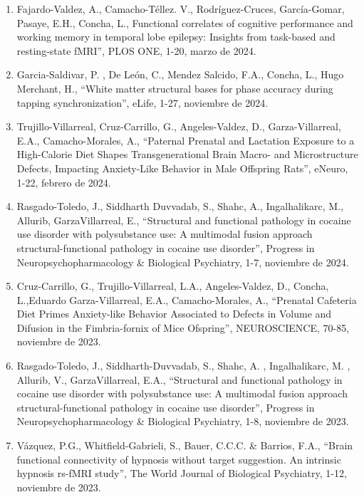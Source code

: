 \begin{enumerate}
\item Fajardo-Valdez, A., Camacho-Téllez. V., Rodríguez-Cruces, García-Gomar, Pasaye, E.H., Concha, L., Functional correlates of cognitive 
performance and working memory in temporal lobe epilepsy: Insights from task-based and resting-state fMRI”, PLOS ONE, 1-20, marzo de 2024.

\item Garcia-Saldivar, P. , De León, C., Mendez Salcido, F.A., Concha, L., Hugo Merchant, H., “White matter structural bases for phase 
accuracy 
during tapping synchronization”, eLife, 1-27, noviembre de 2024.

\item Trujillo-Villarreal, Cruz-Carrillo, G., Angeles-Valdez, D., Garza-Villarreal, E.A., Camacho-Morales, A., “Paternal Prenatal and 
Lactation 
Exposure to a High-Calorie Diet Shapes Transgenerational Brain Macro- and Microstructure Defects, Impacting Anxiety-Like Behavior in Male 
Offspring Rats”, eNeuro, 1-22, febrero de 2024.

\item Rasgado-Toledo, J., Siddharth Duvvadab, S., Shahc, A., Ingalhalikarc, M., Allurib, GarzaVillarreal, E., “Structural and functional 
pathology 
in cocaine use disorder with polysubstance use: A multimodal fusion approach structural-functional pathology in cocaine use disorder”, 
Progress in Neuropsychopharmacology \& Biological Psychiatry, 1-7, noviembre de 2024.

\item Cruz-Carrillo, G., Trujillo-Villarreal, L.A., Angeles-Valdez, D., Concha, L.,Eduardo Garza-Villarreal, E.A., Camacho-Morales, A., 
“Prenatal 
Cafeteria Diet Primes Anxiety-like Behavior Associated to Defects in Volume and Difusion in the Fimbria-fornix of Mice Ofspring”, 
NEUROSCIENCE, 70-85, noviembre de 2023.

\item Rasgado-Toledo, J., Siddharth-Duvvadab, S., Shahc, A. , Ingalhalikarc, M. , Allurib, V., GarzaVillarreal, E.A., “Structural and 
functional 
pathology in cocaine use disorder with polysubstance use: A multimodal fusion approach structural-functional pathology in cocaine use 
disorder”, Progress in Neuropsychopharmacology \& Biological Psychiatry, 1-8, noviembre de 2023.

\item Vázquez, P.G., Whitfield-Gabrieli, S., Bauer, C.C.C. \& Barrios, F.A., “Brain functional connectivity of hypnosis without target 
suggestion. 
An intrinsic hypnosis rs-fMRI study”, The World Journal of Biological Psychiatry, 1-12, noviembre de 2023.


\end{enumerate}
